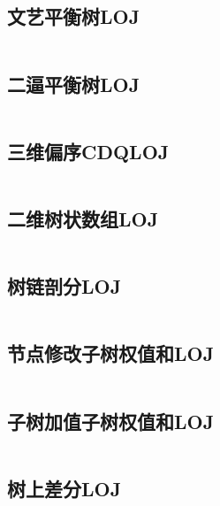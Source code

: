 \inputminted{cpp}{code/普通平衡树LOJ.cc}

\subsection{文艺平衡树LOJ} 

\inputminted{cpp}{code/文艺平衡树LOJ.cc}

\subsection{二逼平衡树LOJ} 

\inputminted{cpp}{code/二逼平衡树LOJ.cc}

\subsection{三维偏序CDQLOJ} 

\inputminted{cpp}{code/三维偏序CDQLOJ.cc}

\subsection{	二维树状数组LOJ} 

\inputminted{cpp}{code/二维树状数组LOJ.cc}

\subsection{树链剖分LOJ} 

\inputminted{cpp}{code/树链剖分LOJ.cc}

\subsection{节点修改子树权值和LOJ} 

\inputminted{cpp}{code/节点修改子树权值和LOJ.cc}

\subsection{子树加值子树权值和LOJ} 

\inputminted{cpp}{code/子树加值子树权值和LOJ.cc}

\subsection{树上差分LOJ} 

\inputminted{cpp}{code/树上差分LOJ.cc}

